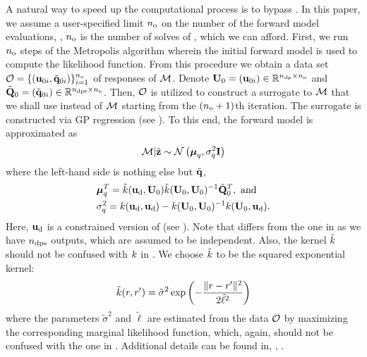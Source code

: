 A natural way to speed up the computational process is to bypass . In this paper, we assume a user-specified limit ${n_\text{o}}$ on the number of the forward model evaluations, \ie, ${n_\text{o}}$ is the number of solves of , which we can afford. First, we run ${n_\text{o}}$ steps of the Metropolis algorithm wherein the initial forward model is used to compute the likelihood function. From this procedure we obtain a data set $\mathcal{O} = \{ (\mathbf{u}_{0i}, \tilde{\mathbf{q}}_{0i}) \}_{i = 1}^{n_\text{o}}$ of responses of $\model$. Denote $\mathbf{U}_0 = (\mathbf{u}_{0i}) \in \mathbb{R}^{{n_\text{dp}} \times {n_\text{o}}}$ and $\tilde{\mathbf{Q}}_0 = (\tilde{\mathbf{q}}_{0i}) \in \mathbb{R}^{{n_\text{dps}} \times {n_\text{o}}}$. Then, $\mathcal{O}$ is utilized to construct a surrogate to $\model$ that we shall use instead of $\model$ starting from the $({n_\text{o}} + 1)$th iteration. The surrogate is constructed via GP regression (see ). To this end, the forward model is approximated as
\begin{equation} \elabel{gp-approximation}
  \model | \tilde{\vz} \sim \gaussian{\vmean_\T}{\sigma^2_\T \mI}
\end{equation}
where the left-hand side is nothing else but $\tilde{\mathbf{q}}$,
\begin{align}
  & \vmean_\T^T = \tilde{\fCov}(\vu_\data, \mU_0) \tilde{\fCov}(\mU_0, \mU_0)^{-1} \mmT_0^T, \text{ and} \elabel{gp-mean} \\
  & \sigma^2_\T = \fCov{\vu_\data, \vu_\data} - \fCov{\mU_0, \mU_0}^{-1} \fCov{\mU_0, \vu_\data}. \elabel{gp-variance}
\end{align}
Here, $\mathbf{u}_{\text{d}}$ is a constrained version of  (see ). Note that  differs from the one in  as we have ${n_\text{dps}}$ outputs, which are assumed to be independent. Also, the kernel $\tilde{\fCov}$ should not be confused with $\fCov$ in . We choose $\tilde{\fCov}$ to be the squared exponential kernel:
\[
  \tilde{\fCov}(\r, \r') = \tilde{\sigma}^2 \exp\left(-\frac{\norm{\r - \r'}^2}{2 \tilde{\ell}^2}\right)
\]
where the parameters $\tilde{\sigma}^2$ and $\tilde{\ell}$ are estimated from the data $\mathcal{O}$ by maximizing the corresponding marginal likelihood function, which, again, should not be confused with the one in . Additional details can be found in, \eg, \cite{mackay2003, rasmussen2006}.

